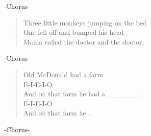 -Chorus-

\begin{verse}
Three little monkeys jumping on the bed \\
One fell off and bumped his head \\
Mama called the doctor and the doctor, \\
\end{verse}

-Chorus-

\begin{verse}
Old McDonald had a farm \\
E-I-E-I-O \\
And on that farm he had a \_\_\_\_\_\_. \\
E-I-E-I-O \\
And on that farm he... \\
\end{verse}

-Chorus-
